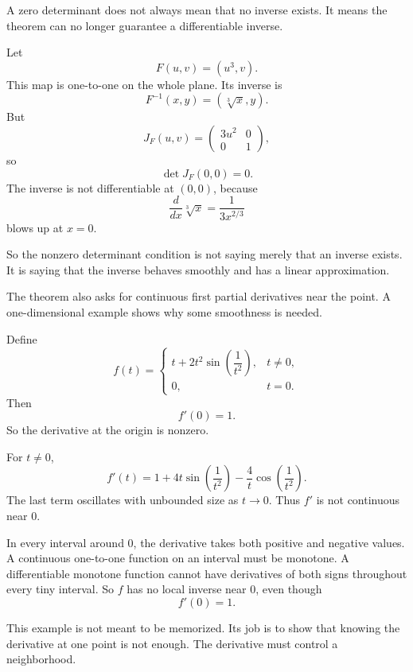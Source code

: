 A zero determinant does not always mean that no inverse exists.  It means the theorem
can no longer guarantee a differentiable inverse.

\begin{example}
Let
\[
    F(u,v)=(u^3,v).
\]
This map is one-to-one on the whole plane.  Its inverse is
\[
    F^{-1}(x,y)=(\sqrt[3]{x},y).
\]
But
\[
    J_F(u,v)=
    \begin{pmatrix}
        3u^2 & 0\\
        0 & 1
    \end{pmatrix},
\]
so
\[
    \det J_F(0,0)=0.
\]
The inverse is not differentiable at \((0,0)\), because
\[
    \frac{d}{dx}\sqrt[3]{x}
    =
    \frac{1}{3x^{2/3}}
\]
blows up at \(x=0\).

So the nonzero determinant condition is not saying merely that an inverse exists.  It is
saying that the inverse behaves smoothly and has a linear approximation.
\end{example}

The theorem also asks for continuous first partial derivatives near the point.  A
one-dimensional example shows why some smoothness is needed.

\begin{example}
Define
\[
    f(t)=
    \begin{cases}
    t+2t^2\sin\left(\dfrac{1}{t^2}\right), & t\ne0,\\[2mm]
    0, & t=0.
    \end{cases}
\]
Then
\[
    f'(0)=1.
\]
So the derivative at the origin is nonzero.

For \(t\ne0\),
\[
    f'(t)=
    1+4t\sin\left(\frac1{t^2}\right)
    -
    \frac4t\cos\left(\frac1{t^2}\right).
\]
The last term oscillates with unbounded size as \(t\to0\).  Thus \(f'\) is not
continuous near \(0\).

In every interval around \(0\), the derivative takes both positive and negative values.
A continuous one-to-one function on an interval must be monotone.  A differentiable
monotone function cannot have derivatives of both signs throughout every tiny interval.
So \(f\) has no local inverse near \(0\), even though
\[
    f'(0)=1.
\]

This example is not meant to be memorized.  Its job is to show that knowing the
derivative at one point is not enough.  The derivative must control a neighborhood.
\end{example}

